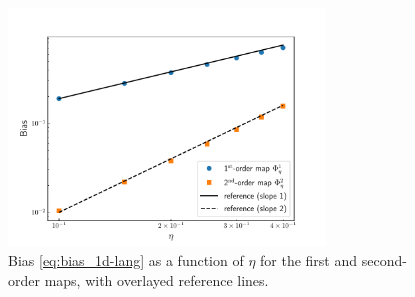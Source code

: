 \documentclass[11pt]{article}
\theoremstyle{definition}
\begin{document}
\begin{figure}[ht]
	\centering
	\includegraphics[width=0.75\textwidth]{1d-lang_bias.pdf}
	\caption{Bias \eqref{eq:bias_1d-lang} as a function of $\eta$ for the first and second-order maps, with overlayed reference lines.}
	\label{fig:1d_lang_bias}
\end{figure}
\end{document}
